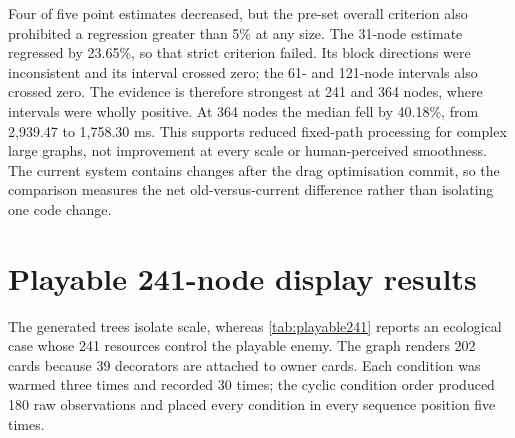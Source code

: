 \begin{table}[htbp]
\centering
\caption{Fixed-path drag processing for the pre-optimisation and current versions. Values are median [Q1, Q3].}
\label{tab:dragscale}
\small
{}
\end{table}

Four of five point estimates decreased, but the pre-set overall criterion also prohibited a regression greater than 5\% at any size. The 31-node estimate regressed by 23.65\%, so that strict criterion failed. Its block directions were inconsistent and its interval crossed zero; the 61- and 121-node intervals also crossed zero. The evidence is therefore strongest at 241 and 364 nodes, where intervals were wholly positive. At 364 nodes the median fell by 40.18\%, from 2,939.47 to 1,758.30 ms. This supports reduced fixed-path processing for complex large graphs, not improvement at every scale or human-perceived smoothness. The current system contains changes after the drag optimisation commit, so the comparison measures the net old-versus-current difference rather than isolating one code change.

\section{Playable 241-node display results}

The generated trees isolate scale, whereas \cref{tab:playable241} reports an ecological case whose 241 resources control the playable enemy. The graph renders 202 cards because 39 decorators are attached to owner cards. Each condition was warmed three times and recorded 30 times; the cyclic condition order produced 180 raw observations and placed every condition in every sequence position five times.

